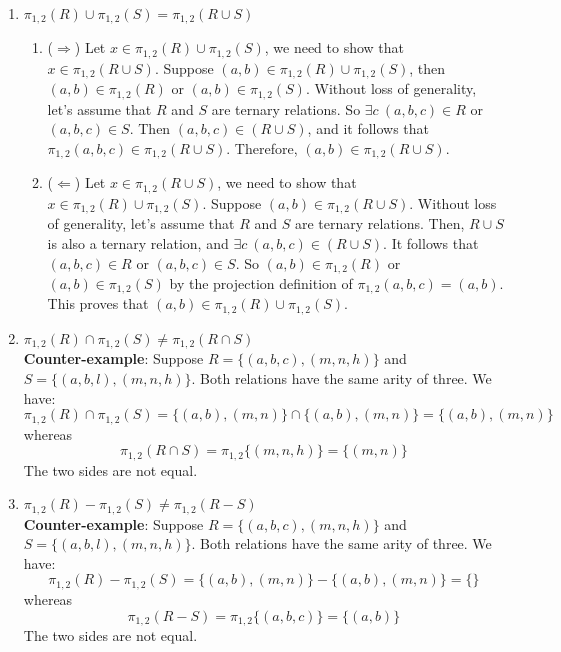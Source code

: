 \begin{enumerate} 
  \item $\pi_{1,2}(R) \cup \pi_{1,2}(S) = \pi_{1,2}(R \cup S)$
  \begin{enumerate}
    \item ($\Rightarrow$) Let $x \in \pi_{1,2}(R) \cup \pi_{1,2}(S)$, we need to show that $x \in \pi_{1,2}(R \cup S)$. 
    Suppose $(a,b) \in \pi_{1,2}(R) \cup \pi_{1,2}(S)$, then $(a,b) \in \pi_{1,2}(R)$ or $(a,b) \in \pi_{1,2}(S)$. Without 
    loss of generality, let's assume that $R$ and $S$ are ternary relations. So $\exists c \: (a,b,c) \in R$ or $(a,b,c) 
    \in S$. Then $(a,b,c) \in (R \cup S)$, and it follows that $\pi_{1,2}(a,b,c) \in \pi_{1,2}(R \cup S)$. 
    Therefore, $(a,b) \in \pi_{1,2}(R \cup S)$.

    \item ($\Leftarrow$) Let $x \in \pi_{1,2}(R \cup S)$, we need to show that $x \in \pi_{1,2}(R) \cup \pi_{1,2}(S)$. 
    Suppose $(a,b) \in \pi_{1,2}(R \cup S)$. Without loss of generality, let's assume that $R$ and $S$ are ternary relations. 
    Then, $R \cup S$ is also a ternary relation, and $\exists c \: (a,b,c) \in (R \cup S)$. It follows that $(a,b,c) \in R$ or 
    $(a,b,c) \in S$. So $(a,b) \in \pi_{1,2}(R)$ or $(a,b) \in \pi_{1,2}(S)$ by the projection definition of $\pi_{1,2}(a,b,c) 
    = (a,b)$. This proves that $(a,b) \in \pi_{1,2}(R) \cup \pi_{1,2}(S)$.
  \end{enumerate}

  \item $\pi_{1,2}(R) \cap \pi_{1,2}(S) \neq \pi_{1,2}(R \cap S)$ \\
  \textbf{Counter-example}: Suppose $R = \{(a,b,c),(m,n,h)\}$ and $S = \{(a,b,l),(m,n,h)\}$. Both relations have the same arity 
  of three. We have:
  \begin{equation*}
    \pi_{1,2}(R) \cap \pi_{1,2}(S) = \{(a,b),(m,n)\} \cap \{(a,b),(m,n)\} = \{(a,b),(m,n)\}
  \end{equation*}
  whereas 
  \begin{equation*}
    \pi_{1,2}(R \cap S) = \pi_{1,2}\{(m,n,h)\} = \{(m,n)\}
  \end{equation*}
  The two sides are not equal.

  \item $\pi_{1,2}(R) - \pi_{1,2}(S) \neq \pi_{1,2}(R - S)$ \\
  \textbf{Counter-example}: Suppose $R = \{(a,b,c),(m,n,h)\}$ and $S = \{(a,b,l),(m,n,h)\}$. Both relations have the same arity 
  of three. We have:
  \begin{equation*}
    \pi_{1,2}(R) - \pi_{1,2}(S) = \{(a,b),(m,n)\} - \{(a,b),(m,n)\} = \{\}
  \end{equation*}
  whereas 
  \begin{equation*}
    \pi_{1,2}(R - S) = \pi_{1,2}\{(a,b,c)\} = \{(a,b)\}
  \end{equation*}
  The two sides are not equal.
\end{enumerate}
